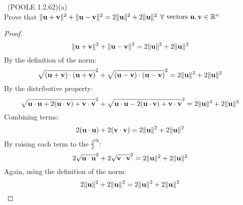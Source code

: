 \begin{problem}{\problemnum \, \textsf{(POOLE 1.2.62)}(a)}\\
	Prove that $\lVert\mathbf{u}+\mathbf{v}\rVert^{2} + \lVert\mathbf{u}-\mathbf{v}\rVert^{2} = 2\lVert\mathbf{u}\rVert^{2} + 2\lVert\mathbf{u}\rVert^{2}$
	$\forall \text{ vectors } \mathbf{u}, \mathbf{v} \in \mathbb{R}^{n}$
\end{problem}
\begin{solution}
	\begin{proof}

        \[\lVert\mathbf{u} + \mathbf{v}\rVert^{2} + \lVert\mathbf{u} - \mathbf{v}\rVert^{2}
          = 2\lVert\mathbf{u}\rVert^{2} + 2\lVert\mathbf{u}\rVert^{2}
        \]
        By the definition of the norm:
        \[
            \sqrt{(\mathbf{u} + \mathbf{v}) \cdot (\mathbf{u} + \mathbf{v})}^{2}
            + \sqrt{(\mathbf{u} - \mathbf{v}) \cdot (\mathbf{u} - \mathbf{v})}^{2}
            = 2\lVert\mathbf{u}\rVert^{2} + 2\lVert\mathbf{u}\rVert^{2}
        \]
        By the distributive property:
        \[
            \sqrt{ \mathbf{u} \cdot \mathbf{u} + 2(\mathbf{u} \cdot \mathbf{v}) + \mathbf{v} \cdot \mathbf{v} }^{2}
            + \sqrt{ \mathbf{u} \cdot \mathbf{u} - 2(\mathbf{u} \cdot \mathbf{v}) + \mathbf{v} \cdot \mathbf{v} }^{2}
            = 2\lVert\mathbf{u}\rVert^{2} + 2\lVert\mathbf{u}\rVert^{2}
        \]
        Combining terms:
        \[
            2(\mathbf{u} \cdot \mathbf{u}) + 2(\mathbf{v} \cdot \mathbf{v})
            = 2\lVert\mathbf{u}\rVert^{2} + 2\lVert\mathbf{u}\rVert^{2}
        \]
        By raising each term to the $\frac{2}{2}^{\text{th}}$:
        \[
            2\sqrt{\mathbf{u} \cdot \mathbf{u}}^{2} + 2\sqrt{\mathbf{v} \cdot \mathbf{v}}^{2}
            = 2\lVert\mathbf{u}\rVert^{2} + 2\lVert\mathbf{u}\rVert^{2}
        \]
        Again, using the definition of the norm:
        \[
              2\lVert\mathbf{u}\rVert^{2} + 2\lVert\mathbf{u}\rVert^{2}
            = 2\lVert\mathbf{u}\rVert^{2} + 2\lVert\mathbf{u}\rVert^{2}
        \]
    \end{proof}
\end{solution}
